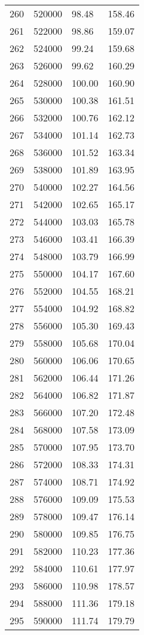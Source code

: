 \documentclass{article}
\begin{document}
\begin{longtable}{@{}l l l l}
260 & 520000 & 98.48 & 158.46\\
261 & 522000 & 98.86 & 159.07\\
262 & 524000 & 99.24 & 159.68\\
263 & 526000 & 99.62 & 160.29\\
264 & 528000 & 100.00 & 160.90\\
265 & 530000 & 100.38 & 161.51\\
266 & 532000 & 100.76 & 162.12\\
267 & 534000 & 101.14 & 162.73\\
268 & 536000 & 101.52 & 163.34\\
269 & 538000 & 101.89 & 163.95\\
270 & 540000 & 102.27 & 164.56\\
271 & 542000 & 102.65 & 165.17\\
272 & 544000 & 103.03 & 165.78\\
273 & 546000 & 103.41 & 166.39\\
274 & 548000 & 103.79 & 166.99\\
275 & 550000 & 104.17 & 167.60\\
276 & 552000 & 104.55 & 168.21\\
277 & 554000 & 104.92 & 168.82\\
278 & 556000 & 105.30 & 169.43\\
279 & 558000 & 105.68 & 170.04\\
280 & 560000 & 106.06 & 170.65\\
281 & 562000 & 106.44 & 171.26\\
282 & 564000 & 106.82 & 171.87\\
283 & 566000 & 107.20 & 172.48\\
284 & 568000 & 107.58 & 173.09\\
285 & 570000 & 107.95 & 173.70\\
286 & 572000 & 108.33 & 174.31\\
287 & 574000 & 108.71 & 174.92\\
288 & 576000 & 109.09 & 175.53\\
289 & 578000 & 109.47 & 176.14\\
290 & 580000 & 109.85 & 176.75\\
291 & 582000 & 110.23 & 177.36\\
292 & 584000 & 110.61 & 177.97\\
293 & 586000 & 110.98 & 178.57\\
294 & 588000 & 111.36 & 179.18\\
295 & 590000 & 111.74 & 179.79\\

\end{longtable}
\end{document}
